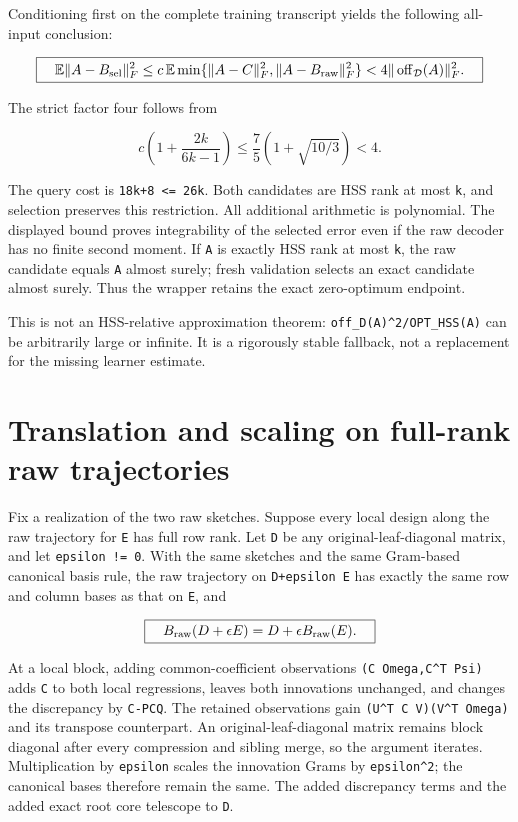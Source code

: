 \documentclass[11pt,oneside,openany,a4paper]{book}
\numberwithin{equation}{chapter}
\theoremstyle{definition}
\theoremstyle{remark}
\begin{document}
Conditioning first on the complete training transcript yields the following all-input conclusion:

\[
 \boxed{\quad
 \mathbb E\|A-B_{\rm sel}\|_F^2
 \le c\,\mathbb E\min\{\|A-C\|_F^2,\|A-B_{\rm raw}\|_F^2\}
 <4\|\operatorname{off}_{\mathcal D}(A)\|_F^2.
 \quad}
\]

The strict factor four follows from

\[
 c\left(1+\frac{2k}{6k-1}\right)
 \le\frac75\left(1+\sqrt{10/3}\right)<4.
\]

The query cost is \texttt{18k+8\ \textless{}=\ 26k}. Both candidates are HSS rank at most \texttt{k}, and selection preserves this restriction. All additional arithmetic is polynomial. The displayed bound proves integrability of the selected error even if the raw decoder has no finite second moment. If \texttt{A} is exactly HSS rank at most \texttt{k}, the raw candidate equals \texttt{A} almost surely; fresh validation selects an exact candidate almost surely. Thus the wrapper retains the exact zero-optimum endpoint.

This is not an HSS-relative approximation theorem: \texttt{\textbar{}\textbar{}off\_D(A)\textbar{}\textbar{}\^{}2/OPT\_HSS(A)} can be arbitrarily large or infinite. It is a rigorously stable fallback, not a replacement for the missing learner estimate.

\section{Translation and scaling on full-rank raw trajectories}\label{fallback:translation-and-scaling-on-full-rank-raw-trajectories}

Fix a realization of the two raw sketches. Suppose every local design along the raw trajectory for \texttt{E} has full row rank. Let \texttt{D} be any original-leaf-diagonal matrix, and let \texttt{epsilon\ !=\ 0}. With the same sketches and the same Gram-based canonical basis rule, the raw trajectory on \texttt{D+epsilon\ E} has exactly the same row and column bases as that on \texttt{E}, and

\[
 \boxed{\quad
 B_{\rm raw}(D+\epsilon E)=D+\epsilon B_{\rm raw}(E).
 \quad}
\]

At a local block, adding common-coefficient observations \texttt{(C\ Omega,C\^{}T\ Psi)} adds \texttt{C} to both local regressions, leaves both innovations unchanged, and changes the discrepancy by \texttt{C-PCQ}. The retained observations gain \texttt{(U\^{}T\ C\ V)(V\^{}T\ Omega)} and its transpose counterpart. An original-leaf-diagonal matrix remains block diagonal after every compression and sibling merge, so the argument iterates. Multiplication by \texttt{epsilon} scales the innovation Grams by \texttt{epsilon\^{}2}; the canonical bases therefore remain the same. The added discrepancy terms and the added exact root core telescope to \texttt{D}.
\end{document}

